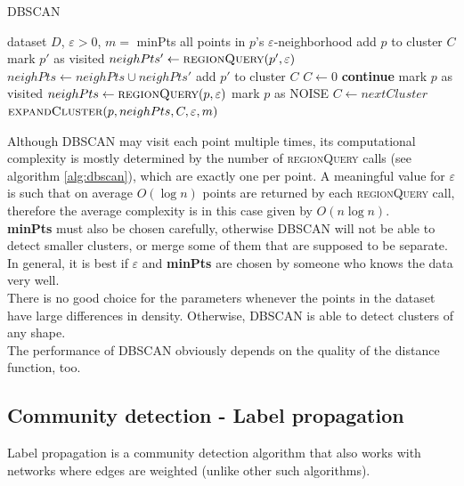 \documentclass[a4paper,11pt]{book}
\begin{document}
\begin{algorithm}
\caption{DBSCAN}\label{alg:dbscan}
\begin{algorithmic}[1]
\Require dataset $D$, $\varepsilon > 0$, $m = $ minPts
\State \Return all points in $p$'s $\varepsilon$-neighborhood
\EndFunction
{}
\State add $p$ to cluster $C$
\State mark $p'$ as visited
\State $neighPts'\gets \Call{regionQuery}{p',\varepsilon}$
\State $neighPts\gets neighPts\cup neighPts'$
\EndIf
\EndIf
{}
\State add $p'$ to cluster $C$
\EndIf
\EndFor
\EndFunction
{}
\State $C \gets 0$
\State \textbf{continue}
\EndIf
\State mark $p$ as visited
\State $neighPts\gets \Call{regionQuery}{p,\varepsilon}$
\State mark $p$ as NOISE
\Else
\State $C\gets nextCluster$
\State $\Call{expandCluster}{p, neighPts, C, \varepsilon, m}$
\EndIf
\EndFor
\EndFunction
\end{algorithmic}
\end{algorithm}
Although DBSCAN may visit each point multiple times, its computational complexity is mostly determined by the number of \textsc{regionQuery} calls (see algorithm \ref{alg:dbscan}), which are exactly one per point. A meaningful value for $\varepsilon$ is such that on average $O(\log n)$ points are returned by each \textsc{regionQuery} call, therefore the average complexity is in this case given by $O(n\log n)$.\\

\textbf{minPts} must also be chosen carefully, otherwise DBSCAN will not be able to detect smaller clusters, or merge some of them that are supposed to be separate. In general, it is best if $\varepsilon$ and \textbf{minPts} are chosen by someone who knows the data very well.\\
There is no good choice for the parameters whenever the points in the dataset have large differences in density. Otherwise, DBSCAN is able to detect clusters of any shape.\\
The performance of DBSCAN obviously depends on the quality of the distance function, too.
\newpage
\subsection{Community detection - Label propagation}
Label propagation is a community detection algorithm that also works with networks where edges are weighted (unlike other such algorithms).\\
\end{document}
